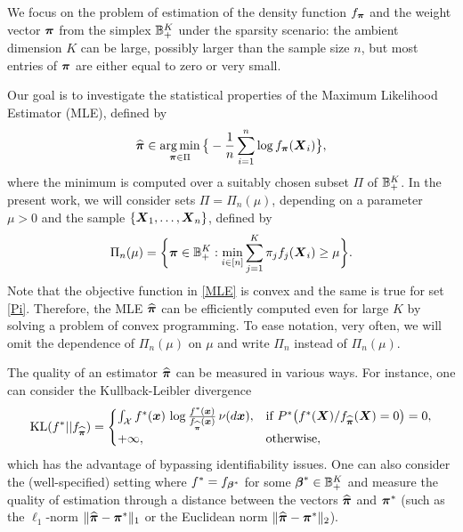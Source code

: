 We focus on the problem of estimation of the density function $f_{\boldsymbol \pi}$ and the weight vector $\boldsymbol \pi$ from the simplex
${\mathbb B}_+^K$ under the sparsity scenario: the ambient dimension $K$ can be large, possibly larger than the sample size
$n$, but most entries of $\boldsymbol \pi$ are either equal to zero or very small.

Our goal is to investigate the statistical properties of the Maximum Likelihood Estimator (MLE), defined by
\begin{equation}\label{MLE}
\widehat{\boldsymbol \pi} \in \operatorname*{arg\,min}_{\boldsymbol \pi\in \Pi}\big\{-\frac{1}{n}\sum_{i=1}^n\log f_{\boldsymbol \pi}(\boldsymbol X_i)\big\},
\end{equation}
where the minimum is computed over a suitably chosen subset $\Pi$ of ${\mathbb B}_+^K$. In the present work, we will consider
sets $\Pi=\Pi_n(\mu)$, depending on a parameter $\mu>0$ and the sample $\{\boldsymbol X_1,\ldots,\boldsymbol X_n\}$, defined by
\begin{equation}\label{Pi}
\Pi_n(\mu) = \bigg\{\boldsymbol \pi\in {\mathbb B}_+^K: \min_{i\in [n]}\sum_{j=1}^K \pi_j f_j(\boldsymbol X_i)\geq \mu\bigg\}.
\end{equation}
Note that the objective function in \eqref{MLE} is convex and the same is true for set \eqref{Pi}. Therefore, the MLE
$\widehat{\boldsymbol \pi}$ can be efficiently computed even for large $K$ by solving a problem of convex programming. To ease notation, very often,
we will omit the dependence of $\Pi_n(\mu)$ on $\mu$ and write $\Pi_n$ instead of $\Pi_n(\mu)$.

The quality of an estimator $\widehat{\boldsymbol \pi}$ can be measured in various ways. For instance, one can consider
the Kullback-Leibler divergence 
\begin{equation}
{\rm KL}(f^* ||f_{\widehat{\boldsymbol \pi}}) = 
\begin{cases}
\int_{\mathcal X} f^*(\boldsymbol x)\,\log \frac{f^*(\boldsymbol x)}{f_{\widehat{\boldsymbol \pi}}(\boldsymbol x)}\,\nu(d\boldsymbol x), &
\text{if } P^*\big(f^*(\boldsymbol X)/f_{\widehat{\boldsymbol \pi}}(\boldsymbol X)=0 \big)=0, \\
+\infty, & \text{otherwise},
\end{cases}
\end{equation}
which has the advantage of bypassing identifiability
issues. One can also consider the (well-specified) setting where $f^*=f_{\boldsymbol \beta^*}$ for some $\boldsymbol \beta^*\in{\mathbb B}^K_+$
and measure the quality of estimation through a distance between the vectors $\widehat{\boldsymbol \pi}$ and $\boldsymbol \pi^*$ (such as
the $\ell_1$-norm $\|\widehat{\boldsymbol \pi}-\boldsymbol \pi^*\|_1$ or the Euclidean norm $\|\widehat{\boldsymbol \pi}-\boldsymbol \pi^*\|_2$).

